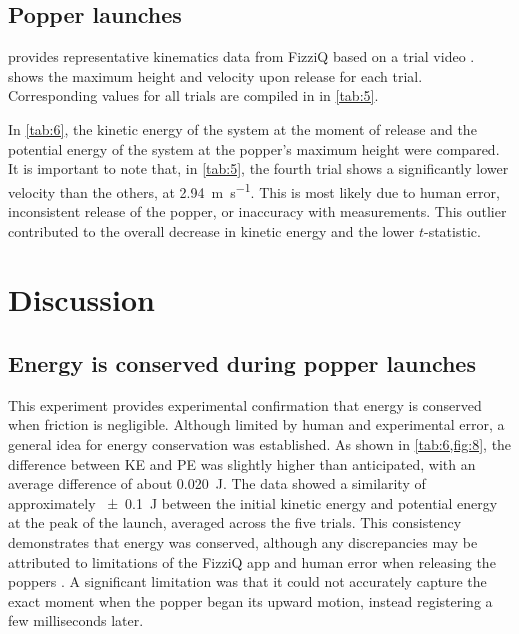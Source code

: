 \documentclass[reprint,amsmath,amssymb,aps,twoside]{revtex4-2} %
\begin{document}
\subsection{Popper launches}
 provides representative kinematics data from FizziQ based on a trial video \cite{chazot:2025:using}.  shows the maximum height and velocity upon release for each trial. Corresponding values for all trials are compiled in in \cref{tab:5}.



In \cref{tab:6}, the kinetic energy of the system at the moment of release and the potential energy of the system at the popper’s maximum height were compared. It is important to note that, in \cref{tab:5}, the fourth trial shows a significantly lower velocity than the others, at \qty{2.94}{\meter\per\second}. This is most likely due to human error, inconsistent release of the popper, or inaccuracy with measurements. This outlier contributed to the overall decrease in kinetic energy and the lower $t$-statistic.










    
    
\section{Discussion}   
\subsection{Energy is conserved during popper launches}
This experiment provides experimental confirmation that energy is conserved when friction is negligible. Although limited by human and experimental error, a general idea for energy conservation was established. As shown in \cref{tab:6,fig:8}, the difference between KE and PE was slightly higher than anticipated, with an average difference of about \qty{0.020}{\joule}. The data showed a similarity of approximately \qty{\pm 0.1}{\joule} between the initial kinetic energy and potential energy at the peak of the launch, averaged across the five trials. This consistency demonstrates that energy was conserved, although any discrepancies may be attributed to limitations of the FizziQ app and human error when releasing the poppers \cite{chazot:2025:using}. A significant limitation was that it could not accurately capture the exact moment when the popper began its upward motion, instead registering a few milliseconds later.
%
\end{document}
